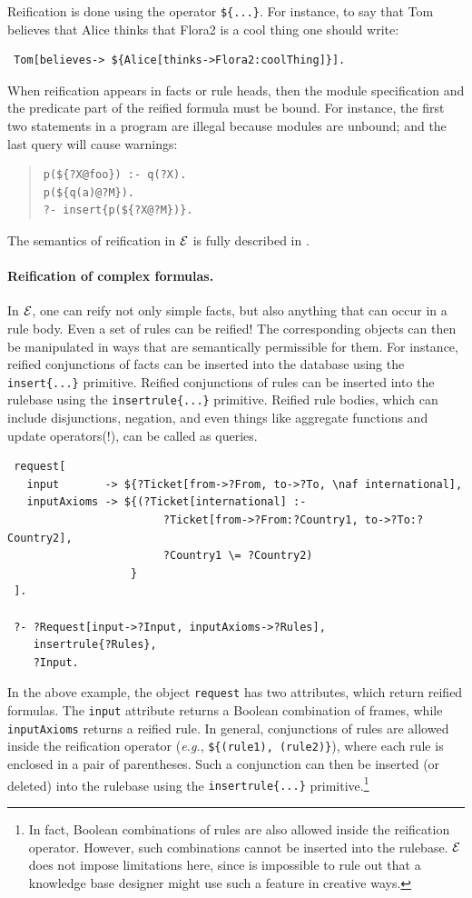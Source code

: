 \documentclass[11pt]{article}
\newcommand{\ERGO}{\mbox{\ensuremath{\cal{E}}\smaller{{\sc{RGO}}}}\xspace}
\newcommand{\FLSYSTEM}{\ERGO}
\begin{document}
Reification is done using the operator {\tt \$\{...\}}. For instance, to
say that Tom believes that Alice thinks that Flora2 is a
cool thing one should write:
\begin{verbatim}
 Tom[believes-> ${Alice[thinks->Flora2:coolThing]}].
\end{verbatim}

When reification appears in facts or rule heads, then the module
specification and the predicate part of the reified formula must be bound.
For instance, the first two statements in a program
are illegal because modules are
unbound; and the last query will cause warnings:
\begin{quote}
\begin{verbatim}
p(${?X@foo}) :- q(?X).
p(${q(a)@?M}).
?- insert{p(${?X@?M})}. 
\end{verbatim}
\end{quote}

\noindent
The semantics of reification in \FLSYSTEM is fully described in
\cite{reification-data-semantics-03}.

\paragraph{Reification of complex formulas.}
In \FLSYSTEM, one can reify not only simple facts, but also anything that
can occur in a rule body. Even a set of rules can be reified!
The corresponding objects can then be manipulated in ways that are semantically
permissible for them. For instance, reified conjunctions of facts can be
inserted into the database using the \verb|insert{...}| primitive. 
Reified conjunctions of rules can be inserted into the rulebase using the
\verb|insertrule{...}| primitive. Reified rule bodies, which can include
disjunctions, negation, and even things like aggregate functions and update
operators(!), can be called as queries.
\begin{verbatim}
 request[
   input       -> ${?Ticket[from->?From, to->?To, \naf international],
   inputAxioms -> ${(?Ticket[international] :-
                        ?Ticket[from->?From:?Country1, to->?To:?Country2],
                        ?Country1 \= ?Country2)
                   }
 ].

 ?- ?Request[input->?Input, inputAxioms->?Rules],
    insertrule{?Rules},
    ?Input.
\end{verbatim}

In the above example, the object {\tt request} has two attributes, which
return reified formulas. The {\tt input} attribute returns a Boolean
combination of frames, while {\tt inputAxioms} returns a reified rule.
In general, conjunctions of rules are allowed inside the reification
operator ({\it e.g.}, \verb|${(rule1), (rule2)}|), where each rule is
enclosed in a pair of parentheses. Such a conjunction can then be inserted
(or deleted) into the rulebase using the {\tt insertrule\{...\}}
primitive.\footnote{
  In fact, Boolean combinations of rules are also allowed inside the
  reification operator. However, such combinations cannot be inserted into
  the rulebase. \FLSYSTEM does not impose limitations here, since is
  impossible to rule out that a knowledge base designer might use such a
  feature in creative ways.
}
\end{document}
